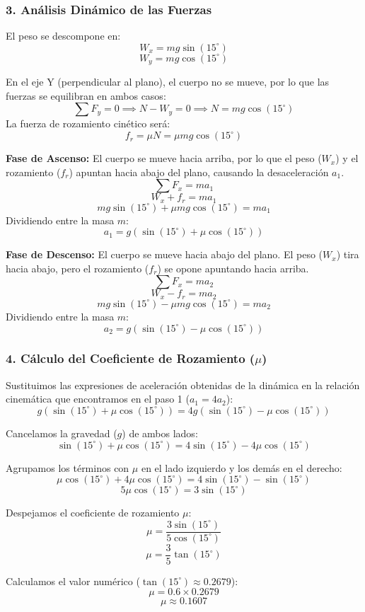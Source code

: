 \documentclass[12pt, a4paper]{article}
\begin{document}
\subsubsection*{3. Análisis Dinámico de las Fuerzas}
El peso se descompone en:
$$ W_x = m g \sin(15^\circ) $$
$$ W_y = m g \cos(15^\circ) $$

En el eje Y (perpendicular al plano), el cuerpo no se mueve, por lo que las fuerzas se equilibran en ambos casos:
$$ \sum F_y = 0 \implies N - W_y = 0 \implies N = m g \cos(15^\circ) $$
La fuerza de rozamiento cinético será:
$$ f_r = \mu N = \mu m g \cos(15^\circ) $$

\textbf{Fase de Ascenso:}
El cuerpo se mueve hacia arriba, por lo que el peso ($W_x$) y el rozamiento ($f_r$) apuntan hacia abajo del plano, causando la desaceleración $a_1$.
$$ \sum F_x = m a_1 $$
$$ W_x + f_r = m a_1 $$
$$ m g \sin(15^\circ) + \mu m g \cos(15^\circ) = m a_1 $$
Dividiendo entre la masa $m$:
$$ a_1 = g (\sin(15^\circ) + \mu \cos(15^\circ)) $$

\textbf{Fase de Descenso:}
El cuerpo se mueve hacia abajo del plano. El peso ($W_x$) tira hacia abajo, pero el rozamiento ($f_r$) se opone apuntando hacia arriba.
$$ \sum F_x = m a_2 $$
$$ W_x - f_r = m a_2 $$
$$ m g \sin(15^\circ) - \mu m g \cos(15^\circ) = m a_2 $$
Dividiendo entre la masa $m$:
$$ a_2 = g (\sin(15^\circ) - \mu \cos(15^\circ)) $$

\subsubsection*{4. Cálculo del Coeficiente de Rozamiento ($\mu$)}
Sustituimos las expresiones de aceleración obtenidas de la dinámica en la relación cinemática que encontramos en el paso 1 ($a_1 = 4 a_2$):
$$ g (\sin(15^\circ) + \mu \cos(15^\circ)) = 4 g (\sin(15^\circ) - \mu \cos(15^\circ)) $$

Cancelamos la gravedad ($g$) de ambos lados:
$$ \sin(15^\circ) + \mu \cos(15^\circ) = 4 \sin(15^\circ) - 4 \mu \cos(15^\circ) $$

Agrupamos los términos con $\mu$ en el lado izquierdo y los demás en el derecho:
$$ \mu \cos(15^\circ) + 4 \mu \cos(15^\circ) = 4 \sin(15^\circ) - \sin(15^\circ) $$
$$ 5 \mu \cos(15^\circ) = 3 \sin(15^\circ) $$

Despejamos el coeficiente de rozamiento $\mu$:
$$ \mu = \frac{3 \sin(15^\circ)}{5 \cos(15^\circ)} $$
$$ \mu = \frac{3}{5} \tan(15^\circ) $$

Calculamos el valor numérico ($\tan(15^\circ) \approx 0.2679$):
$$ \mu = 0.6 \times 0.2679 $$
$$ \mu \approx 0.1607 $$
\end{document}

